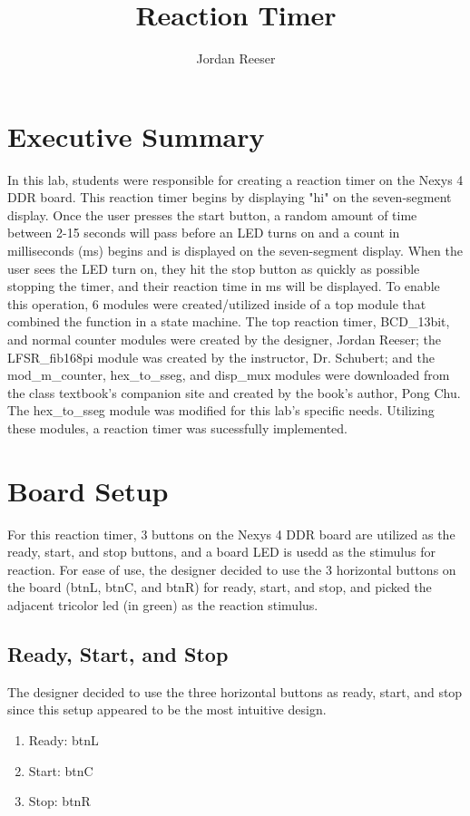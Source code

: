 \documentclass{article}
\author{Jordan Reeser}
\title{Reaction Timer}
\begin{document}
\maketitle

\section{Executive Summary}
In this lab, students were responsible for creating a reaction timer on the Nexys 4 DDR board. This reaction timer begins by displaying "hi" on the seven-segment display. Once the user presses the start button, a random amount of time between 2-15 seconds will pass before an LED turns on and a count in milliseconds (ms) begins and is displayed on the seven-segment display. When the user sees the LED turn on, they hit the stop button as quickly as possible stopping the timer, and their reaction time in ms will be displayed. To enable this operation, 6 modules were created/utilized inside of a top module that combined the function in a state machine. The top reaction timer, BCD\_13bit, and normal counter modules were created by the designer, Jordan Reeser; the LFSR\_fib168pi module was created by the instructor, Dr. Schubert; and the mod\_m\_counter, hex\_to\_sseg, and disp\_mux modules were downloaded from the class textbook's companion site and created by the book's author, Pong Chu. The hex\_to\_sseg module was modified for this lab's specific needs. Utilizing these modules, a reaction timer was sucessfully implemented.	

\section{Board Setup}
For this reaction timer, 3 buttons on the Nexys 4 DDR board are utilized as the ready, start, and stop buttons, and a board LED is usedd as the stimulus for reaction. For ease of use, the designer decided to use the 3 horizontal buttons on the board (btnL, btnC, and btnR) for ready, start, and stop, and picked the adjacent tricolor led (in green) as the reaction stimulus.

\subsection{Ready, Start, and Stop}
The designer decided to use the three horizontal buttons as ready, start, and stop since this setup appeared to be the most intuitive design.
\begin{enumerate}
	\item Ready: btnL
	\item Start: btnC
	\item Stop: btnR
\end{enumerate} 
\end{document}
